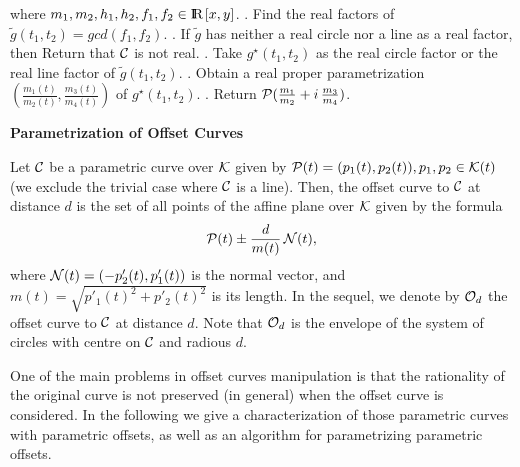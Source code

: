 \hspace*{3 mm} 
where $m_1,m_2,h_1,h_2,f_1,f_2 \in {\rm I\kern -2.2pt R\hskip 1pt}[x,y]$.
. Find the real factors of  $\tilde{g}(t_1,t_2)=gcd(f_1,f_2)$. 
. If $\tilde{g}$ has neither a real circle  nor a line as a  real factor, 
 then {\sc Return} that ${\cal C}$ is not real. 
. Take $g^{\star}(t_1,t_2)$ as the real circle factor or the real line 
 factor of $\tilde{g}(t_{1},t_{2})$. 
. Obtain a real proper parametrization 
$(\frac{m_{1}(t)}{m_{2}(t)},\frac{m_{3}(t)}{m_{4}(t)})$   
 of   $g^{\star}(t_1,t_2)$. 
. {\sc Return} ${\cal P}(\frac{m_1}{m_2}+
i\,\frac{m_3}{m_4})$.
\newpage
\begin{center}
{\bf Parametrization  of Offset Curves}
\end{center}
\vspace{1 mm}
Let ${\cal C}$ be a parametric curve over ${\cal K}$ given by ${\cal P}(t)=
 (p_{1}(t),p_{2}(t)), p_{1},p_{2} \in {\cal K}(t)$ (we exclude the trivial 
case where ${\cal C}$ is a line). Then, the offset 
curve to ${\cal C}$ at distance $d$ is the set of all 
points of the affine plane  over ${\cal K}$ given by the formula 
\[ {\cal P}(t) \pm \frac{d}{m(t)} \,{\cal N}(t),
\]
where ${\cal N}(t)=(-p'_{2}(t), p'_{1}(t))$ is the normal vector,  and 
$m(t)= \sqrt{p'_{1}(t)^{2}+p'_{2}(t)^{2}}$ is its length. In the sequel, we 
denote by ${\cal O}_{d}$ the offset curve to ${\cal C}$ at distance $d$. 
Note that ${\cal O}_{d}$ is the envelope of the system of circles with 
centre on ${\cal C}$ and  radious $d$. 

One of the main problems in offset curves manipulation is that the 
rationality of the original curve is not preserved (in general) when the 
offset curve is considered. In the following we give a characterization of 
those parametric curves with parametric offsets, as well as an algorithm 
for parametrizing parametric offsets. 

